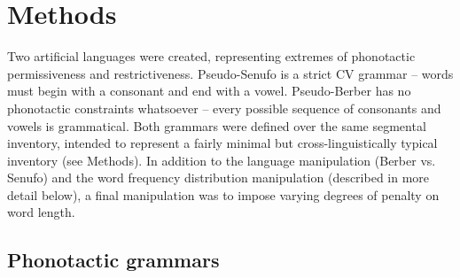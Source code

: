 \documentclass[11pt]{article}
\begin{document}

\section{Methods}
\vspace*{-5pt}
Two artificial languages were created, representing extremes of phonotactic permissiveness and restrictiveness. Pseudo-Senufo is a strict CV grammar -- words must begin with a consonant and end with a vowel.%
Pseudo-Berber has no phonotactic constraints whatsoever -- every possible sequence of consonants and vowels is grammatical. Both grammars were defined over the same segmental inventory, intended to represent a fairly minimal but cross-linguistically typical inventory (see Methods). In addition to the language manipulation (Berber vs. Senufo) and the word frequency distribution manipulation (described in more detail below), a final manipulation was to impose varying degrees of penalty on word length.
 
\subsection{Phonotactic grammars}
\end{document}
